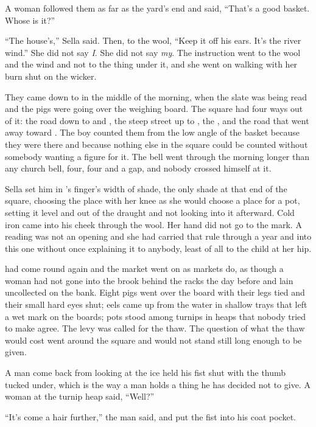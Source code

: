 A woman followed them as far as the yard's end and said, “That's a good basket. Whose is it?”

“The house's,” Sella said. Then, to the wool, “Keep it off his ears. It's the river wind.” She did not say \emph{I}. She did not say \emph{my}. The instruction went to the wool and the wind and not to the thing under it, and she went on walking with her burn shut on the wicker.

They came down to  in the middle of the morning, when the slate was being read and the pigs were going over the weighing board. The square had four ways out of it: the road down to  and , the steep street up to , the , and the road that went away toward . The boy counted them from the low angle of the basket because they were there and because nothing else in the square could be counted without somebody wanting a figure for it. The bell went through the morning longer than any church bell, four, four and a gap, and nobody crossed himself at it.

Sella set him in 's finger's width of shade, the only shade at that end of the square, choosing the place with her knee as she would choose a place for a pot, setting it level and out of the draught and not looking into it afterward. Cold iron came into his cheek through the wool. Her hand did not go to the mark. A reading was not an opening and she had carried that rule through a year and into this one without once explaining it to anybody, least of all to the child at her hip.

 had come round again and the market went on as markets do, as though a woman had not gone into the brook behind the racks the day before and lain uncollected on the bank. Eight pigs went over the board with their legs tied and their small hard eyes shut; eels came up from the water in shallow trays that left a wet mark on the boards; pots stood among turnips in heaps that nobody tried to make agree. The levy was called for the thaw. The question of what the thaw would cost went around the square and would not stand still long enough to be given.

A man come back from looking at the ice held his fist shut with the thumb tucked under, which is the way a man holds a thing he has decided not to give. A woman at the turnip heap said, “Well?”

“It's come a hair further,” the man said, and put the fist into his coat pocket.

